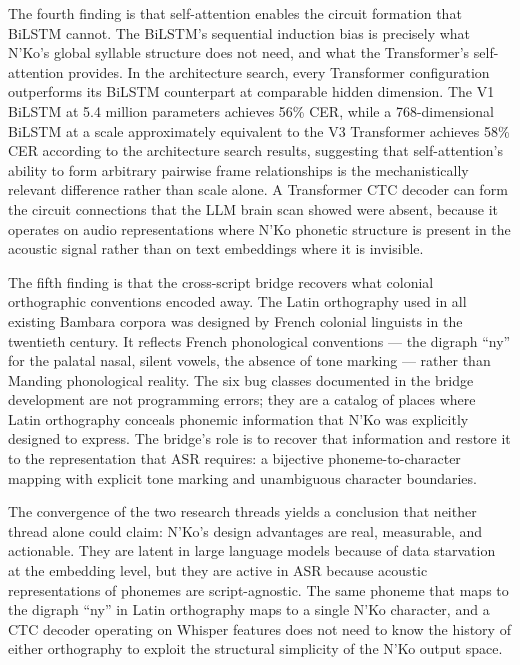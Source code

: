 \documentclass[11pt]{article}
\newcommand{\nko}{N'Ko}
\begin{document}
The fourth finding is that self-attention enables the circuit formation that BiLSTM cannot. The BiLSTM's sequential induction bias is precisely what \nko{}'s global syllable structure does not need, and what the Transformer's self-attention provides. In the architecture search, every Transformer configuration outperforms its BiLSTM counterpart at comparable hidden dimension. The V1 BiLSTM at 5.4 million parameters achieves 56\% CER, while a 768-dimensional BiLSTM at a scale approximately equivalent to the V3 Transformer achieves 58\% CER according to the architecture search results, suggesting that self-attention's ability to form arbitrary pairwise frame relationships is the mechanistically relevant difference rather than scale alone. A Transformer CTC decoder can form the circuit connections that the LLM brain scan showed were absent, because it operates on audio representations where \nko{} phonetic structure is present in the acoustic signal rather than on text embeddings where it is invisible.

The fifth finding is that the cross-script bridge recovers what colonial orthographic conventions encoded away. The Latin orthography used in all existing Bambara corpora was designed by French colonial linguists in the twentieth century. It reflects French phonological conventions --- the digraph ``ny'' for the palatal nasal, silent vowels, the absence of tone marking --- rather than Manding phonological reality. The six bug classes documented in the bridge development are not programming errors; they are a catalog of places where Latin orthography conceals phonemic information that \nko{} was explicitly designed to express. The bridge's role is to recover that information and restore it to the representation that ASR requires: a bijective phoneme-to-character mapping with explicit tone marking and unambiguous character boundaries.

The convergence of the two research threads yields a conclusion that neither thread alone could claim: \nko{}'s design advantages are real, measurable, and actionable. They are latent in large language models because of data starvation at the embedding level, but they are active in ASR because acoustic representations of phonemes are script-agnostic. The same phoneme that maps to the digraph ``ny'' in Latin orthography maps to a single \nko{} character, and a CTC decoder operating on Whisper features does not need to know the history of either orthography to exploit the structural simplicity of the \nko{} output space.
\end{document}

